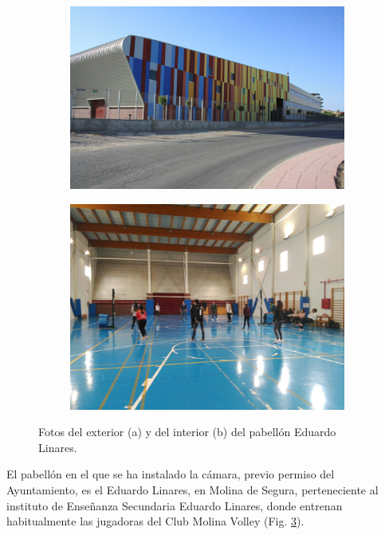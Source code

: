 \begin{figure}
\begin{subfigure}{.5\textwidth}
  \centering
  \includegraphics[width=.9\linewidth]{images/EduardoLinares}
  \caption { }
  \label{fig:pabellonFuera}
\end{subfigure}%
\begin{subfigure}{.5\textwidth}
  \centering
  \includegraphics[width=.9\linewidth]{images/EduardoLinaresDentro}
  \caption { }
  \label{fig:pabellonDentro}
\end{subfigure}
\caption{Fotos del exterior (a) y del interior (b) del pabellón Eduardo Linares. }
\label{fig:pabellon}
\end{figure}

El pabellón en el que se ha instalado la cámara, previo permiso del Ayuntamiento, es el Eduardo Linares, en Molina de Segura, perteneciente al instituto de Enseñanza Secundaria Eduardo Linares, donde entrenan habitualmente las jugadoras del Club Molina Volley (Fig. \ref{fig:pabellon}).

